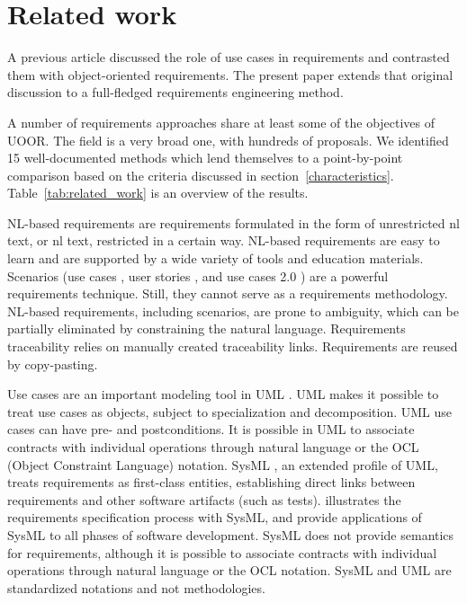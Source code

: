 \section{Related work}
\label{approaches}
A previous article \cite{46} discussed the role of use cases
in requirements and contrasted them with object-oriented requirements. The present paper extends that original discussion to a full-fledged requirements engineering method. 

A number of requirements approaches share at least some of the objectives of UOOR. The field is a very broad one, with hundreds of proposals. We identified 15 well-documented methods which lend themselves to a point-by-point comparison based on the criteria discussed in section~\ref{characteristics}. Table~\ref{tab:related_work} is an overview of the results.



NL-based requirements \cite{wiegers, 17, RELAX} are requirements formulated in the form of unrestricted \acrshort{nl} text, or \acrshort{nl} text, restricted in a certain way. NL-based requirements are easy to learn and are supported by a wide variety of tools and education materials. Scenarios (use cases \cite{43}, user stories \cite{14}, and use cases 2.0 \cite{25, 26}) are a powerful requirements technique. Still, they cannot serve as a requirements methodology. NL-based requirements, including scenarios, are prone to ambiguity, which can be partially eliminated by constraining the natural language. Requirements traceability relies on manually created traceability links. Requirements are reused by copy-pasting.

Use cases are an important modeling tool in UML \cite{55}. UML makes it possible to treat use cases as objects, subject to specialization and decomposition. UML use cases can have pre- and postconditions. It is possible in UML to associate contracts with individual operations through  natural language or the OCL (Object Constraint Language) notation. SysML \cite{47}, an extended profile of UML, treats requirements as first-class entities, establishing direct links between requirements and other software artifacts (such as tests). \cite{58} illustrates the requirements specification process with SysML, and \cite{5, 52, 57} provide applications of SysML to all phases of software development. SysML does not provide semantics for requirements, although it is possible to associate contracts with individual operations through natural language or the OCL notation. SysML and UML are standardized notations and not methodologies. 

